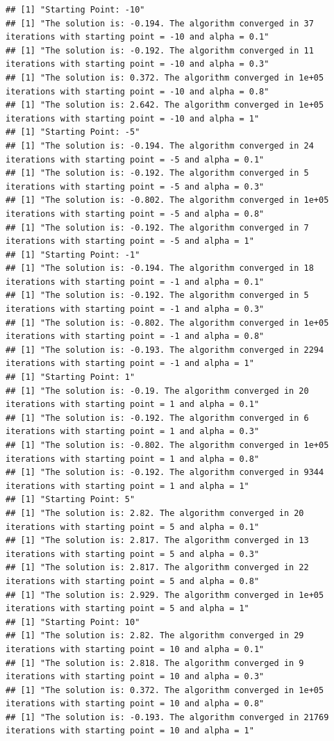 \documentclass[]{article}
\begin{document}
\begin{verbatim}
## [1] "Starting Point: -10"
## [1] "The solution is: -0.194. The algorithm converged in 37 iterations with starting point = -10 and alpha = 0.1"
## [1] "The solution is: -0.192. The algorithm converged in 11 iterations with starting point = -10 and alpha = 0.3"
## [1] "The solution is: 0.372. The algorithm converged in 1e+05 iterations with starting point = -10 and alpha = 0.8"
## [1] "The solution is: 2.642. The algorithm converged in 1e+05 iterations with starting point = -10 and alpha = 1"
## [1] "Starting Point: -5"
## [1] "The solution is: -0.194. The algorithm converged in 24 iterations with starting point = -5 and alpha = 0.1"
## [1] "The solution is: -0.192. The algorithm converged in 5 iterations with starting point = -5 and alpha = 0.3"
## [1] "The solution is: -0.802. The algorithm converged in 1e+05 iterations with starting point = -5 and alpha = 0.8"
## [1] "The solution is: -0.192. The algorithm converged in 7 iterations with starting point = -5 and alpha = 1"
## [1] "Starting Point: -1"
## [1] "The solution is: -0.194. The algorithm converged in 18 iterations with starting point = -1 and alpha = 0.1"
## [1] "The solution is: -0.192. The algorithm converged in 5 iterations with starting point = -1 and alpha = 0.3"
## [1] "The solution is: -0.802. The algorithm converged in 1e+05 iterations with starting point = -1 and alpha = 0.8"
## [1] "The solution is: -0.193. The algorithm converged in 2294 iterations with starting point = -1 and alpha = 1"
## [1] "Starting Point: 1"
## [1] "The solution is: -0.19. The algorithm converged in 20 iterations with starting point = 1 and alpha = 0.1"
## [1] "The solution is: -0.192. The algorithm converged in 6 iterations with starting point = 1 and alpha = 0.3"
## [1] "The solution is: -0.802. The algorithm converged in 1e+05 iterations with starting point = 1 and alpha = 0.8"
## [1] "The solution is: -0.192. The algorithm converged in 9344 iterations with starting point = 1 and alpha = 1"
## [1] "Starting Point: 5"
## [1] "The solution is: 2.82. The algorithm converged in 20 iterations with starting point = 5 and alpha = 0.1"
## [1] "The solution is: 2.817. The algorithm converged in 13 iterations with starting point = 5 and alpha = 0.3"
## [1] "The solution is: 2.817. The algorithm converged in 22 iterations with starting point = 5 and alpha = 0.8"
## [1] "The solution is: 2.929. The algorithm converged in 1e+05 iterations with starting point = 5 and alpha = 1"
## [1] "Starting Point: 10"
## [1] "The solution is: 2.82. The algorithm converged in 29 iterations with starting point = 10 and alpha = 0.1"
## [1] "The solution is: 2.818. The algorithm converged in 9 iterations with starting point = 10 and alpha = 0.3"
## [1] "The solution is: 0.372. The algorithm converged in 1e+05 iterations with starting point = 10 and alpha = 0.8"
## [1] "The solution is: -0.193. The algorithm converged in 21769 iterations with starting point = 10 and alpha = 1"
\end{verbatim}
\end{document}
